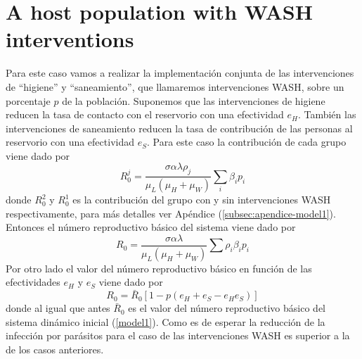 \documentclass[12pt,a4paper]{article}
\theoremstyle{plain}%
\theoremstyle{definition}
\theoremstyle{remark}
\begin{document}
	\section{A host population with WASH interventions}
	Para este caso vamos a realizar la implementación conjunta 
	de las intervenciones de ``higiene'' y ``saneamiento'', 
	que llamaremos intervenciones WASH,
	sobre un porcentaje $p$ de la población. %
	Suponemos que las intervenciones de higiene reducen la tasa de contacto con el reservorio 
	con una efectividad $e_H$. También las intervenciones de saneamiento reducen la tasa de contribución de las personas al reservorio con una efectividad $e_S$.
	Para este caso la contribución de cada grupo viene dado por 
	\begin{equation}
	R_{0}^j=\frac{\sigma \alpha \lambda \rho_j}{ \mu_L (\mu_H+\mu_W)} \sum_i \beta_i p_i
	\end{equation}
	donde $R_{0}^2$ y $R_{0}^1$ es la contribución del grupo con y sin %
	intervenciones WASH
	respectivamente, para más detalles ver Apéndice (\ref{subsec:apendice-model1}). 
	Entonces el número reproductivo básico del sistema viene dado por 
	\begin{equation}
	R_0=\frac{\sigma \alpha \lambda }{ \mu_L (\mu_H+\mu_W)}\sum \rho_i \beta_i p_i 
	\end{equation}
	Por otro lado el valor del número reproductivo básico en función de las efectividades $ e_H$ y $e_S$ viene dado por   
	\begin{equation}\label{R0model1caso3}
	R_0=\bar R_0  \left[ 1- p(e_H+e_{S}-e_H e_{S})\right] 
	\end{equation}	
	donde al igual que antes $\bar R_0$ es el valor del número reproductivo básico del sistema dinámico inicial (\ref{model1}).
	Como es de esperar la reducción de la infección por parásitos para el caso de las 
	intervenciones WASH
	es superior a la  de los casos anteriores. 
	
	
\end{document}
